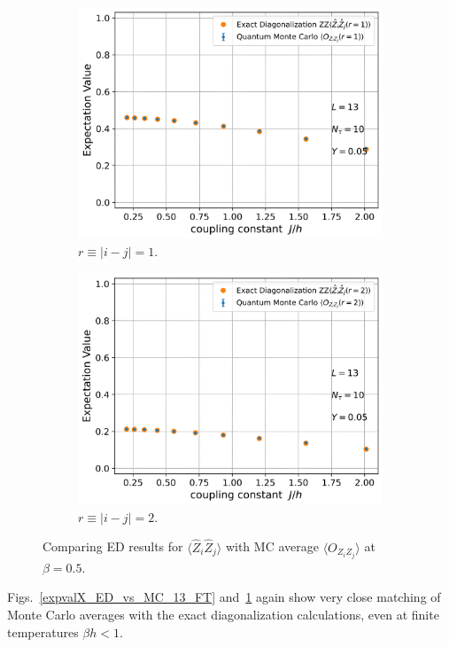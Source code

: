 \documentclass[../thesis_main.tex]{subfiles}
\begin{document}
\begin{figure}[!htb]
    \centering
    \begin{subfigure}[b]{0.49\textwidth}  %
        \centering
        \includegraphics[width=\textwidth]{images/finite temps L13/ZZ1.png}
        \caption{$r \equiv |i-j| = 1$.}
    \end{subfigure}
    \begin{subfigure}[b]{0.49\textwidth}
        \centering
        \includegraphics[width=\textwidth]{images/finite temps L13/ZZ2.png}
        \caption{$r \equiv |i-j| = 2$.}
    \end{subfigure}
    \caption{Comparing ED results for $\langle \hat{Z}_i \hat{Z}_j \rangle$ with MC average $\langle O_{Z_i Z_j} \rangle$ at $\beta = 0.5$.}
    \label{expvalZZ_ED_vs_MC_13_FT}
\end{figure}
\FloatBarrier
Figs.~\ref{expvalX_ED_vs_MC_13_FT} and~\ref{expvalZZ_ED_vs_MC_13_FT} again show very close matching of Monte Carlo averages with the exact diagonalization calculations, even at finite temperatures $\beta h < 1$. 
\end{document}
